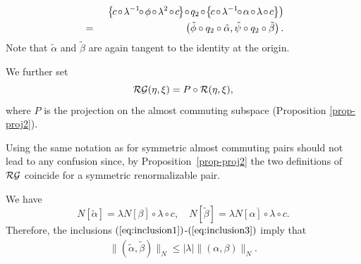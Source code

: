 \begin{eqnarray}
\nonumber &\phantom{=}& \left. \ \left\{ \hspace{-0.4mm} c \hspace{-0.4mm} \circ \hspace{-0.4mm} \lambda^{-1} \! \! \circ \hspace{-0.4mm} \phi \hspace{-0.4mm}\circ \hspace{-0.4mm} \lambda^2 \hspace{-0.4mm} \circ \hspace{-0.4mm} c \hspace{-0.4mm} \right\} \! \circ  \hspace{-0.4mm} q_2 \hspace{-0.4mm} \circ \! \left\{ \hspace{-0.4mm} c \hspace{-0.4mm} \circ  \hspace{-0.4mm}  \lambda^{-1}\! \!  \circ \hspace{-0.4mm} \alpha \hspace{-0.4mm} \circ \hspace{-0.4mm} \lambda \hspace{-0.4mm} \circ \hspace{-0.4mm} c \hspace{-0.1mm} \right\}\right) \\
\label{eq:tildezeta} &=& \left( \tilde{\phi} \circ q_2 \circ \tilde{\alpha}, \tilde{\psi} \circ q_2 \circ \tilde{\beta} \right).
\end{eqnarray}
Note that $\tilde{\alpha}$ and $\tilde{\beta}$ are again tangent to the identity at the origin.

We further set
\begin{equation}
\mathcal{RG}(\eta,\xi)=P \circ \mathcal{R}(\eta,\xi),
\end{equation}
where $P$ is the projection on the almost commuting subspace (Proposition \ref{prop-proj2}).

\noindent
Using the same notation as for symmetric almost commuting pairs should not lead to any confusion since, by Proposition~\ref{prop-proj2} the two definitions of $\mathcal{RG}$ coincide for a symmetric renormalizable pair.


We have 
$$N[\tilde{\alpha}]=\overline{ \lambda N[\beta] \circ \lambda \circ c}, \quad N[\tilde{\beta}]=\overline{ \lambda N[\alpha] \circ \lambda \circ c}.$$
Therefore, the inclusions $(\ref{eq:inclusion1})$-$(\ref{eq:inclusion3})$ imply that
\begin{eqnarray}
\label{2nd-coord-shrink}
\|(\tilde{\alpha},\tilde{\beta} )\|_N \le |\lambda| \|(\alpha,\beta) \|_N. 
\end{eqnarray}



